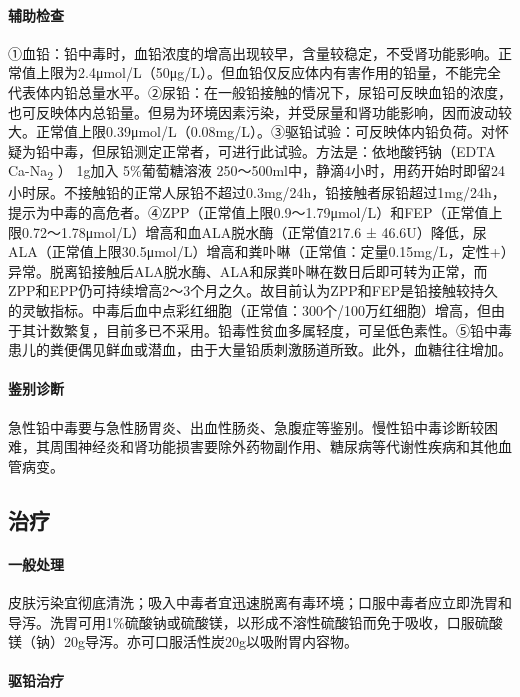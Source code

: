 \paragraph{辅助检查}

①血铅：铅中毒时，血铅浓度的增高出现较早，含量较稳定，不受肾功能影响。正常值上限为2.4μmol/L（50μg/L）。但血铅仅反应体内有害作用的铅量，不能完全代表体内铅总量水平。②尿铅：在一般铅接触的情况下，尿铅可反映血铅的浓度，也可反映体内总铅量。但易为环境因素污染，并受尿量和肾功能影响，因而波动较大。正常值上限0.39μmol/L（0.08mg/L）。③驱铅试验：可反映体内铅负荷。对怀疑为铅中毒，但尿铅测定正常者，可进行此试验。方法是：依地酸钙钠（EDTA
Ca-Na\textsubscript{2} ） 1g加入 5\%葡萄糖溶液
250～500ml中，静滴4小时，用药开始时即留24小时尿。不接触铅的正常人尿铅不超过0.3mg/24h，铅接触者尿铅超过1mg/24h，提示为中毒的高危者。④ZPP（正常值上限0.9～1.79μmol/L）和FEP（正常值上限0.72～1.78μmol/L）增高和血ALA脱水酶（正常值217.6
±
46.6U）降低，尿ALA（正常值上限30.5μmol/L）增高和粪卟啉（正常值：定量0.15mg/L，定性+）异常。脱离铅接触后ALA脱水酶、ALA和尿粪卟啉在数日后即可转为正常，而ZPP和EPP仍可持续增高2～3个月之久。故目前认为ZPP和FEP是铅接触较持久的灵敏指标。中毒后血中点彩红细胞（正常值：300个/100万红细胞）增高，但由于其计数繁复，目前多已不采用。铅毒性贫血多属轻度，可呈低色素性。⑤铅中毒患儿的粪便偶见鲜血或潜血，由于大量铅质刺激肠道所致。此外，血糖往往增加。

\paragraph{鉴别诊断}

急性铅中毒要与急性肠胃炎、出血性肠炎、急腹症等鉴别。慢性铅中毒诊断较困难，其周围神经炎和肾功能损害要除外药物副作用、糖尿病等代谢性疾病和其他血管病变。

\subsection{治疗}

\paragraph{一般处理}

皮肤污染宜彻底清洗；吸入中毒者宜迅速脱离有毒环境；口服中毒者应立即洗胃和导泻。洗胃可用1\%硫酸钠或硫酸镁，以形成不溶性硫酸铅而免于吸收，口服硫酸镁（钠）20g导泻。亦可口服活性炭20g以吸附胃内容物。

\paragraph{驱铅治疗}

